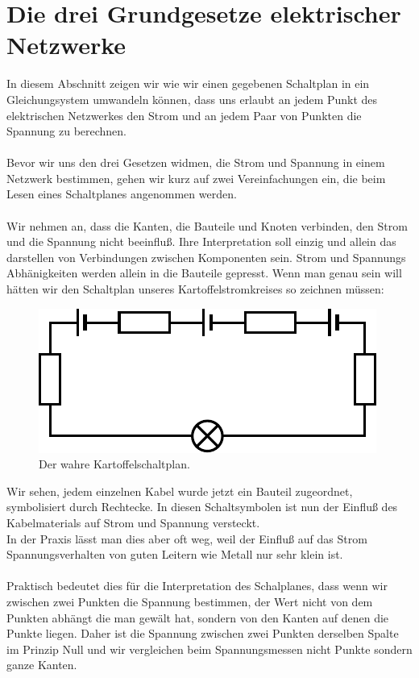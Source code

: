 \documentclass[11pt,a4paper,leqno]{report}
\numberwithin{equation}{chapter}
\begin{document}
\section{Die drei Grundgesetze elektrischer Netzwerke}
In diesem Abschnitt zeigen wir wie wir einen gegebenen Schaltplan in ein Gleichungsystem umwandeln k\"onnen, dass uns erlaubt an jedem Punkt des elektrischen Netzwerkes den Strom und an jedem Paar von Punkten die Spannung zu berechnen.\\
\\
Bevor wir uns den drei Gesetzen widmen, die Strom und Spannung in einem Netzwerk bestimmen, gehen wir kurz auf zwei Vereinfachungen ein, die beim Lesen eines Schaltplanes angenommen werden.\\
\\
Wir nehmen an, dass die Kanten, die Bauteile und Knoten verbinden, den Strom und die Spannung nicht beeinflu\ss{}. Ihre Interpretation soll einzig und allein das darstellen von Verbindungen zwischen Komponenten sein. Strom und Spannungs Abh\"anigkeiten werden allein in die Bauteile gepresst. Wenn man genau sein will h\"atten wir den Schaltplan unseres Kartoffelstromkreises so zeichnen m\"ussen:
\begin{figure}[H]
	\begin{center}
		\includegraphics[scale=0.6]{true_kartoffel.pdf}
		\caption{Der wahre Kartoffelschaltplan.}
	\end{center}
\end{figure}
\noindent
Wir sehen, jedem einzelnen Kabel wurde jetzt ein Bauteil zugeordnet, symbolisiert durch Rechtecke. In diesen Schaltsymbolen ist nun der Einflu\ss{} des Kabelmaterials auf Strom und Spannung versteckt.\\
In der Praxis l\"asst man dies aber oft weg, weil der Einflu\ss{} auf das Strom Spannungsverhalten von guten Leitern wie Metall nur sehr klein ist.
\\
\\
Praktisch bedeutet dies f\"ur die Interpretation des Schalplanes, dass wenn wir zwischen zwei Punkten die Spannung bestimmen, der Wert nicht von dem Punkten abh\"angt die man gew\"alt hat, sondern von den Kanten auf denen die Punkte liegen. Daher ist die Spannung zwischen zwei Punkten derselben Spalte im Prinzip Null und wir vergleichen beim Spannungsmessen nicht Punkte sondern ganze Kanten.
\end{document}

